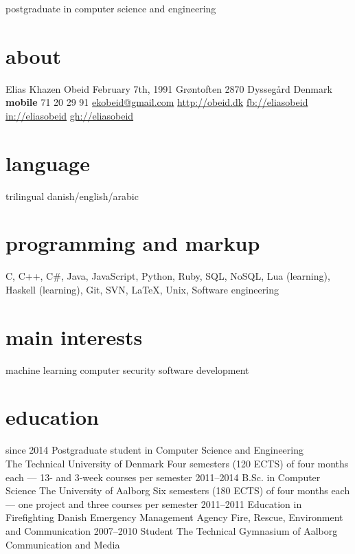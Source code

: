 \documentclass[print]{friggeri-cv}
\begin{document}
    {postgraduate in computer science and engineering}

\begin{aside}
  \section{about}
    Elias Khazen Obeid
    February 7th, 1991
    Grøntoften 
    2870 Dyssegård
    Denmark
    ~
    \textbf{mobile} 71 20 29 91
    \href{mailto:ekobeid@gmail.com}{ekobeid@gmail.com}
    \href{http://obeid.dk}{http://obeid.dk}
    \href{https://www.facebook.com/eliaskhazenobeid}{fb://eliasobeid}
    \href{https://www.linkedin.com/in/eliasobeid}{in://eliasobeid}
    \href{https://github.com/Obeyed}{gh://eliasobeid}
  \section{language}
    trilingual danish/english/arabic
  \section{programming and markup}
    C, C++, C\#, Java, JavaScript, Python, Ruby, SQL, NoSQL,
    Lua (learning), 
    Haskell (learning),
    Git, SVN, \LaTeX{}, Unix,
    Software engineering
  \section{main interests}
    machine learning
    computer security
    software development
\end{aside}

\section{education}

\begin{entrylist}
  \entry
    {since 2014}
    {Postgraduate student {\normalfont in Computer Science and Engineering}\\}
    {The Technical University of Denmark}
    {Four semesters (120 ECTS) of four months each --- 13- and 3-week courses per semester}
  \entry
    {2011–2014}
    {B.Sc. {\normalfont in Computer Science}}
    {The University of Aalborg}
    {Six semesters (180 ECTS) of four months each --- one project and three courses per semester}
  \entry
    {2011–2011}
    {Education in Firefighting}
    {Danish Emergency Management Agency}
    {Fire, Rescue, Environment and Communication}
  \entry
    {2007–2010}
    {Student}
    {The Technical Gymnasium of Aalborg}
    {Communication and Media}
\end{entrylist}
\end{document}
